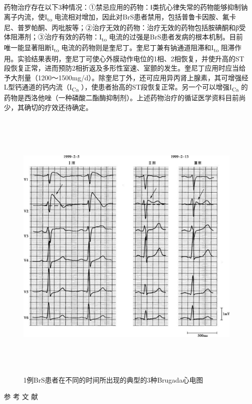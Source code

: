 药物治疗存在以下3种情况：①禁忌应用的药物：Ⅰ类抗心律失常的药物能够抑制钠离子内流，使I\textsubscript{to}
电流相对增加，因此对BrS患者禁用，包括普鲁卡因胺、氟卡尼、普罗帕酮、丙吡胺等；②治疗无效的药物：治疗无效的药物包括胺碘酮和β受体阻滞剂；③治疗有效的药物：I\textsubscript{to}
电流的过强是BrS患者发病的根本机制。目前唯一能显著阻断I\textsubscript{to}
电流的药物则是奎尼丁。奎尼丁兼有钠通道阻滞和I\textsubscript{to}
阻滞作用。实验结果表明，奎尼丁可使心外膜动作电位的1相、2相恢复，并使升高的ST段恢复正常，进而预防2相折返及多形性室速、室颤的发生。奎尼丁应用时应当给予大剂量（1200～1500mg/d）。除奎尼丁外，还可应用异丙肾上腺素，其可增强经L型钙通道的钙内流（I\textsubscript{Ca}
），使患者抬高的ST段恢复正常。另一个可以增强I\textsubscript{Ca}
的药物是西洛他唑（一种磷酸二酯酶抑制剂）。上述药物治疗的循证医学资料目前尚少，其确切的疗效还待确定。

\begin{figure}[!htbp]
 \centering
 \includegraphics[width=6.16667in,height=5.4375in]{./images/Image00468.jpg}
 \captionsetup{justification=centering}
 \caption{1例BrS患者在不同的时间所出现的典型的3种Brugada心电图}
 \label{fig102-21}
  \end{figure} 

\hypertarget{text00299.htmlux5cux23CHP10-2-12-4}{}
参 考 文 献

